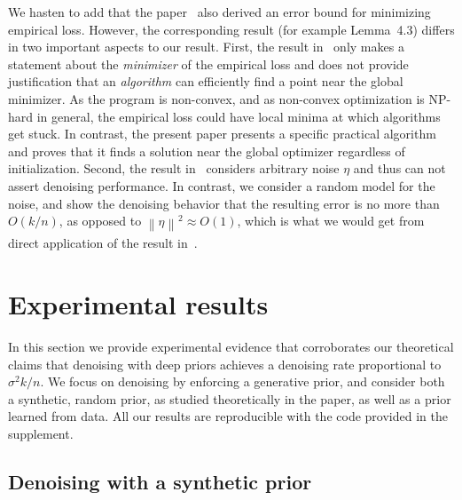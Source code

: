 \documentclass[11pt]{article}
\newcommand{\noise}{\eta}
\newcommand{\Tnorm}{}
\newcommand\norm[2][\Tnorm]{\ensuremath{{\left\|#2\right\|}_{#1}}}
\begin{document}
We hasten to add that the paper~\citep{bora_compressed_2017} also derived an error bound for minimizing empirical loss.
However, the corresponding result (for example Lemma~4.3) differs in two important aspects to our result.  First, the result in~\citep{bora_compressed_2017} only makes a statement about the \emph{minimizer} of the empirical loss and does not provide justification that an \emph{algorithm} can efficiently find a point near the global minimizer.  As the program is non-convex, and as non-convex optimization is NP-hard in general,  the empirical loss could have local minima at which algorithms get stuck.  In contrast, the present paper presents a specific practical algorithm and proves that it finds a solution near the global optimizer regardless of initialization.
Second, the result in~\citep{bora_compressed_2017} considers arbitrary noise $\noise$ and thus can not assert denoising performance.  %
In contrast, we consider a random model for the noise, and show the denoising behavior that the resulting error is no more than $O(k/n)$,
as opposed to $\norm{\noise}^2 \approx O(1)$, which is what we would get from direct application of the result in~\citep{bora_compressed_2017}.

\section{Experimental results}

In this section we provide experimental evidence that corroborates our theoretical claims that denoising with deep priors achieves a denoising rate proportional to $\sigma^2 k/n$.
We focus on denoising by enforcing a generative prior, and consider both a synthetic, random prior, as studied theoretically in the paper, as well as a prior learned from data.
All our results are reproducible with the code provided in the supplement.

\subsection{Denoising with a synthetic prior}
\end{document}
